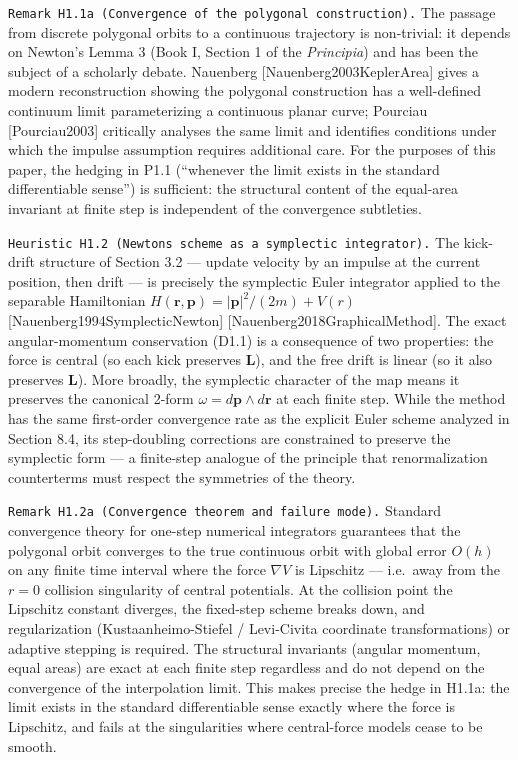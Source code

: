 \documentclass[
]{article}
\begin{document}
\texttt{Remark\ H1.1a\ (Convergence\ of\ the\ polygonal\ construction).}
The passage from discrete polygonal orbits to a continuous trajectory is
non-trivial: it depends on Newton's Lemma 3 (Book I, Section 1 of the
\emph{Principia}) and has been the subject of a scholarly debate.
Nauenberg {[}Nauenberg2003KeplerArea{]} gives a modern reconstruction
showing the polygonal construction has a well-defined continuum limit
parameterizing a continuous planar curve; Pourciau {[}Pourciau2003{]}
critically analyses the same limit and identifies conditions under which
the impulse assumption requires additional care. For the purposes of
this paper, the hedging in P1.1 (``whenever the limit exists in the
standard differentiable sense'') is sufficient: the structural content
of the equal-area invariant at finite step is independent of the
convergence subtleties.

\texttt{Heuristic\ H1.2\ (Newton\textquotesingle{}s\ scheme\ as\ a\ symplectic\ integrator).}
The kick-drift structure of Section 3.2 --- update velocity by an
impulse at the current position, then drift --- is precisely the
symplectic Euler integrator applied to the separable Hamiltonian
\(H(\mathbf r,\mathbf p)=|\mathbf p|^2/(2m)+V(r)\)
{[}Nauenberg1994SymplecticNewton{]} {[}Nauenberg2018GraphicalMethod{]}.
The exact angular-momentum conservation (D1.1) is a consequence of two
properties: the force is central (so each kick preserves \(\mathbf L\)),
and the free drift is linear (so it also preserves \(\mathbf L\)). More
broadly, the symplectic character of the map means it preserves the
canonical 2-form \(\omega=d\mathbf p\wedge d\mathbf r\) at each finite
step. While the method has the same first-order convergence rate as the
explicit Euler scheme analyzed in Section 8.4, its step-doubling
corrections are constrained to preserve the symplectic form --- a
finite-step analogue of the principle that renormalization counterterms
must respect the symmetries of the theory.

\texttt{Remark\ H1.2a\ (Convergence\ theorem\ and\ failure\ mode).}
Standard convergence theory for one-step numerical integrators
guarantees that the polygonal orbit converges to the true continuous
orbit with global error \(O(h)\) on any finite time interval where the
force \(\nabla V\) is Lipschitz --- i.e.~away from the \(r=0\) collision
singularity of central potentials. At the collision point the Lipschitz
constant diverges, the fixed-step scheme breaks down, and regularization
(Kustaanheimo-Stiefel / Levi-Civita coordinate transformations) or
adaptive stepping is required. The structural invariants (angular
momentum, equal areas) are exact at each finite step regardless and do
not depend on the convergence of the interpolation limit. This makes
precise the hedge in H1.1a: the limit exists in the standard
differentiable sense exactly where the force is Lipschitz, and fails at
the singularities where central-force models cease to be smooth.
\end{document}
